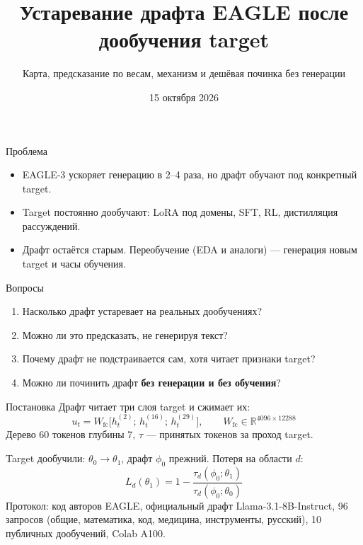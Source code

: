 \documentclass[aspectratio=169,11pt]{beamer}
\title{Устаревание драфта EAGLE после дообучения target}
\subtitle{Карта, предсказание по весам, механизм и дешёвая починка без генерации}
\date{15 октября 2026}
\author{}
\newcommand{\fc}{\mathrm{fc}}
\begin{document}
\maketitle

\begin{frame}{Проблема}
\small
\begin{itemize}
\item EAGLE-3 ускоряет генерацию в 2--4 раза, но драфт обучают под \alert{конкретный} target.
\item Target постоянно дообучают: LoRA под домены, SFT, RL, дистилляция рассуждений.
\item Драфт остаётся старым. Переобучение (EDA и аналоги) --- генерация новым target и часы обучения.
\end{itemize}
\vspace{4pt}
\begin{block}{Вопросы}
\begin{enumerate}
\item Насколько драфт устаревает на реальных дообучениях?
\item Можно ли это предсказать, не генерируя текст?
\item Почему драфт не подстраивается сам, хотя читает признаки target?
\item Можно ли починить драфт \textbf{без генерации и без обучения}?
\end{enumerate}
\end{block}
\end{frame}

\begin{frame}{Постановка}
\small
Драфт читает три слоя target и сжимает их:
\[
u_t=W_{\fc}\big[h^{(2)}_t;\,h^{(16)}_t;\,h^{(29)}_t\big],\qquad W_{\fc}\in\mathbb R^{4096\times12288}
\]
Дерево 60 токенов глубины 7, $\tau$ --- принятых токенов за проход target.

\vspace{6pt}
Target дообучили: $\theta_0\to\theta_1$, драфт $\phi_0$ прежний. Потеря на области $d$:
\[
L_d(\theta_1)=1-\frac{\tau_d(\phi_0;\theta_1)}{\tau_d(\phi_0;\theta_0)}
\]
\small Протокол: код авторов EAGLE, официальный драфт Llama-3.1-8B-Instruct, 96 запросов
(общие, математика, код, медицина, инструменты, русский), 10 публичных дообучений, Colab A100.
\end{frame}
\end{document}
